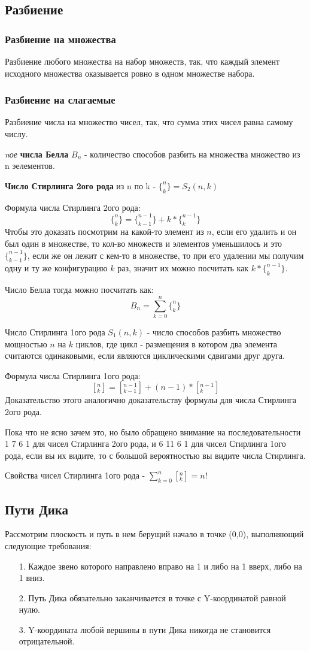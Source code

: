 
\subsection{Разбиение}
\subsubsection{Разбиение на множества}
Разбиение любого множества на набор множеств, так, что каждый элемент исходного множества оказывается ровно в одном множестве набора. 

\subsubsection{Разбиение на слагаемые}
Разбиение числа на множество чисел, так, что сумма этих чисел равна самому числу.

\textit{nое} \textbf{числа Белла} $B_n$ - количество способов разбить на множества множество из n эелементов. 

\textbf{Число Стирлинга 2ого рода} из n по k - $\{_k^n\}=S_2(n, k)$

Формула числа Стирлинга 2ого рода: $$\{_k^n\} = \{_{k - 1}^{n - 1}\}+k*\{_k^{n-1}\}$$
Чтобы это доказать посмотрим на какой-то элемент из $n$, если его удалить и он был один в множестве, то кол-во множеств и элементов уменьшилось и это $\{_{k - 1}^{n - 1}\}$, если же он лежит с кем-то в множестве, то при его удалении мы получим одну и ту же конфигурацию $k$ раз, значит их можно посчитать как $k*\{_k^{n-1}\}$.

Число Белла тогда можно посчитать как: $$B_n = \sum\limits_{k=0}^n\{_k^n\}$$

Число Стирлинга 1ого рода $S_1(n, k)$ - число способов разбить множество мощностью $n$ на $k$ циклов, где цикл - размещения в котором два элемента считаются одинаковыми, если являются циклическими сдвигами друг друга. 

Формула числа Стирлинга 1ого рода: $$\left[_k^n\right] = \left[_{k-1}^{n-1}\right] + (n-1)*[^{n-1}_k]$$
Доказательство этого аналогично доказательству формулы для числа Стирлинга 2ого рода.

Пока что не ясно зачем это, но было обращено внимание на последовательности 1 7 6 1 для чисел Стирлинга 2ого рода, и 6 11 6 1 для чисел Стирлинга 1ого рода, если вы их видите, то с большой вероятностью вы видите числа Стирлинга.

Свойства чисел Стирлинга 1ого рода - $\sum\limits_{k=0}^n[_k^n] = n!$ 
\subsection{Пути Дика}
Рассмотрим плоскость и путь в нем берущий начало в точке (0,0), выполняющий следующие требования:
\begin{enumerate}
    \item [1.] Каждое звено которого направлено вправо на 1 и либо на 1 вверх, либо на 1 вниз.
    \item [2.] Путь Дика обязательно заканчивается в точке с Y-координатой равной нулю.
    \item [3.] Y-координата любой вершины в пути Дика никогда не становится отрицательной.
\end{enumerate}

